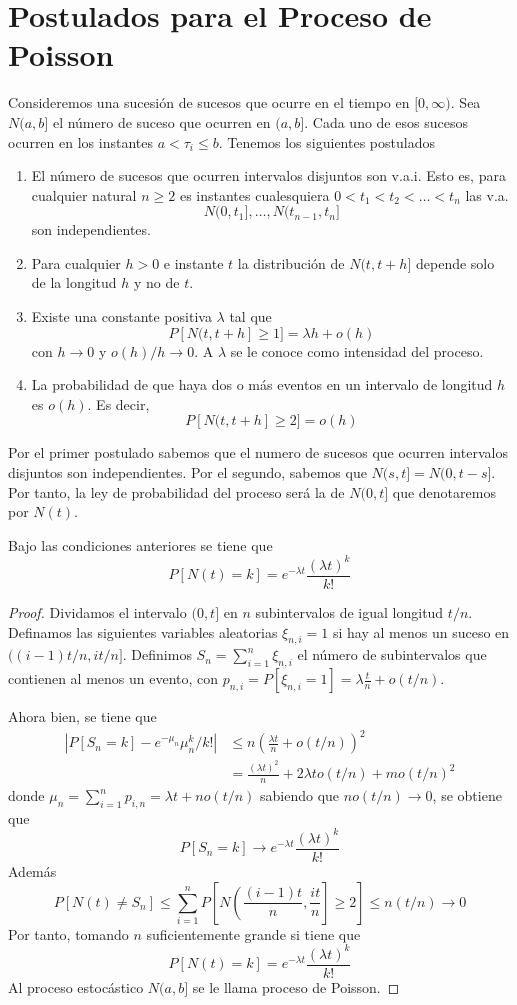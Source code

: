 \documentclass[PREyA.tex]{subfiles}
\providecommand{\abs}[1]{\left\lvert#1\right\rvert}
\begin{document}
\section{Postulados para el Proceso de Poisson}
Consideremos una sucesión de sucesos que ocurre en el tiempo en $[0,\infty)$. Sea $N(a,b]$ el número de suceso que ocurren en $(a,b]$. Cada uno de esos sucesos ocurren en los instantes $a<\tau_i\leq b$. Tenemos los siguientes postulados 
\begin{enumerate}
\item El número de sucesos que ocurren intervalos disjuntos son v.a.i. Esto es, para cualquier natural $n\geq 2$ es instantes cualesquiera $0<t_1<t_2<\dotsc<t_n$ las v.a.
$$
N(0,t_1],\dotsc,N(t_{n-1},t_n]
$$
son independientes.
\item Para cualquier $h>0$ e instante $t$ la distribución de $N(t,t+h]$ depende solo de la longitud $h$ y no de $t$.
\item Existe una constante positiva $\lambda$ tal que 
$$
P[N(t,t+h]\geq 1] = \lambda h + o(h)
$$
con $h\to0$ y $o(h)/h\to 0$. A $\lambda$ se le conoce como intensidad del proceso.
\item La probabilidad de que haya dos o más eventos en un intervalo de longitud $h$ es $o(h)$. Es decir,
$$
P[N(t,t+h]\geq 2] = o(h)
$$
\end{enumerate}
Por el primer postulado sabemos que el numero de sucesos que ocurren intervalos disjuntos son independientes. Por el segundo, sabemos que $N(s,t]=N(0,t-s]$. Por tanto, la ley de probabilidad del proceso será la de $N(0,t]$ que denotaremos por $N(t)$.
\begin{theorem}
Bajo las condiciones anteriores se tiene que
$$
P[N(t)=k]=e^{-\lambda t}\frac{(\lambda t)^k}{k!}
$$
\end{theorem}
\begin{proof}
Dividamos el intervalo $(0,t]$ en $n$ subintervalos de igual longitud $t/n$. Definamos las siguientes variables aleatorias $\xi_{n,i}=1$ si hay al menos un suceso en $((i-1)t/n,it/n]$. Definimos $S_n = \sum_{i=1}^n \xi_{n,i}$ el número de subintervalos que contienen al menos un evento, con $p_{n,i}=P[\xi_{n,i}=1] = \lambda\frac{t}{n}+o(t/n)$. 

Ahora bien, se tiene que
\begin{align*}
\abs{P[S_n=k]-e^{-\mu_n}\mu_n^k / k!}&\leq n\left(\frac{\lambda t}{n}+o(t/n)\right)^2 \\
&=\frac{(\lambda t)^2}{n} + 2\lambda t o(t/n)+ m o(t/n)^2
\end{align*}
donde $\mu_n = \sum_{i=1}^n p_{i,n} = \lambda t + n o(t/n)$ sabiendo que $no(t/n)\to 0$, se obtiene que
$$
P[S_n = k] \to e^{-\lambda t}\frac{(\lambda t)^k}{k!}
$$
Además
$$
P[N(t)\neq S_n] \leq \sum_{i=1}^n P\left[N\left(\frac{(i-1)t}{n},\frac{it}{n}\right]\geq 2 \right] \leq n(t/n)\to 0
$$
Por tanto, tomando $n$ suficientemente grande si tiene que
$$
P[N(t)=k]=e^{-\lambda t}\frac{(\lambda t)^k}{k!}
$$
Al proceso estocástico $N(a,b]$ se le llama proceso de Poisson.
\end{proof}
\end{document}
